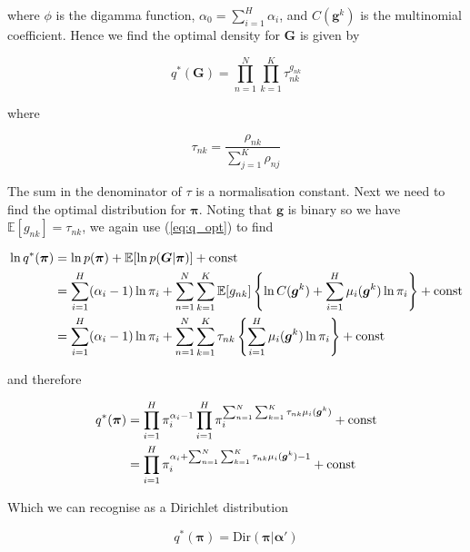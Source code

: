 \documentclass{article}
\begin{document}
where $\phi$ is the digamma function, $\alpha_0 = \sum_{i = 1}^H \alpha_i$, and $C(\boldsymbol{g}^k)$ is the multinomial coefficient. Hence we find the optimal density for $\boldsymbol{G}$ is given by

\begin{equation}
q^*(\boldsymbol{G}) = \prod_{n = 1}^N \prod_{k = 1}^K \tau_{nk}^{g_{nk}}
\end{equation}

where

\begin{equation}
\label{eq:sg_pp}
\tau_{nk} = \frac{\rho_{nk}}{\sum_{j = 1}^K \rho_{nj}}
\end{equation}

The sum in the denominator of $\tau$ is a normalisation constant. Next we need to find the optimal distribution for $\boldsymbol{\pi}$. Noting that $\boldsymbol{g}$ is binary so we have $ \mathbb{E}[g_{nk}] = \tau_{nk}$, we again use (\ref{eq:q_opt}) to find

\begin{align}
    \ln q^*(\boldsymbol{\pi}) &= \ln p(\boldsymbol{\pi}) + \mathbb{E}[\ln p(\boldsymbol{G} | \boldsymbol{\pi})] + \text{const}\notag\\
    &= \sum_{i = 1}^H (\alpha_i - 1) \ln \pi_i + \sum_{n = 1}^N \sum_{k = 1}^K \mathbb{E}[g_{nk}]\left\{ \ln C(\boldsymbol{g}^k) + \sum_{i = 1}^H \mu_i(\boldsymbol{g}^k) \ln \pi_i \right\} + \text{const} \notag\\
    &= \sum_{i = 1}^H (\alpha_i - 1) \ln \pi_i + \sum_{n = 1}^N \sum_{k = 1}^K \tau_{nk} \left\{ \sum_{i = 1}^H \mu_i(\boldsymbol{g}^k) \ln \pi_i \right\} + \text{const}
\end{align}

and therefore

\begin{align}
    q^*(\boldsymbol{\pi}) &= \prod_{i = 1}^H \pi_i^{\alpha_i - 1} \prod_{i = 1}^H \pi_i^{\sum_{n = 1}^N \sum_{k = 1}^K \tau_{nk} \mu_i(\boldsymbol{g}^k)} + \text{const} \notag \\
    &= \prod_{i = 1}^H \pi_i^{\alpha_i + \sum_{n = 1}^N \sum_{k = 1}^K \tau_{nk} \mu_i(\boldsymbol{g}^k) - 1} + \text{const}
\end{align}

Which we can recognise as a Dirichlet distribution

\begin{equation}
q^*(\boldsymbol{\pi}) = \text{Dir}(\boldsymbol{\pi} | \boldsymbol{\alpha}')
\end{equation}
\end{document}
